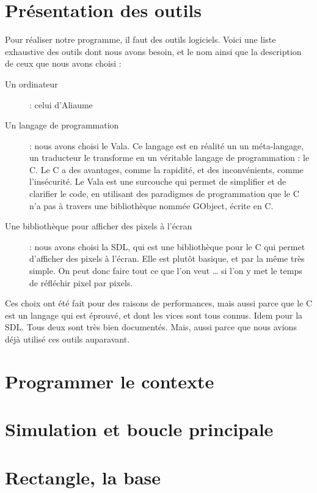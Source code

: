 \section{Présentation des outils}
  Pour réaliser notre programme, il faut des outils logiciels.
  Voici une liste exhaustive des outils dont nous avons besoin, et le 
  nom ainsi que la description de ceux que nous avons choisi : 
    \begin{description}
      \item[Un ordinateur] : celui d'Aliaume 
      \item[Un langage de programmation] : nous avons choisi le Vala. Ce langage est en réalité un
        un méta-langage, un traducteur le transforme en un véritable langage de programmation : le C.
        Le C a des avantages, comme la rapidité, et des inconvénients, comme l'insécurité. Le Vala est une 
        surcouche qui permet de simplifier et de clarifier le code, en utilisant des paradigmes de programmation
        que le C n'a pas à travers une bibliothèque nommée GObject, écrite en C.
      \item[Une bibliothèque pour afficher des pixels à l'écran] : nous avons choisi la SDL, qui est une bibliothèque pour le C qui permet d'afficher des pixels à l'écran. Elle est plutôt basique, et par la même très simple. On peut donc faire tout ce que l'on veut … si l'on y met le temps de réfléchir pixel par pixels.
    \end{description}
  
  Ces choix ont été fait pour des raisons de performances, mais aussi parce que le C est un langage qui est éprouvé, et dont les vices sont tous connus. Idem pour la SDL. Tous deux sont très bien documentés. Mais, aussi parce que nous avions déjà utilisé ces outils auparavant.

\section{Programmer le contexte}
  

\section{Simulation et boucle principale}
  
\section{Rectangle, la base}
  

